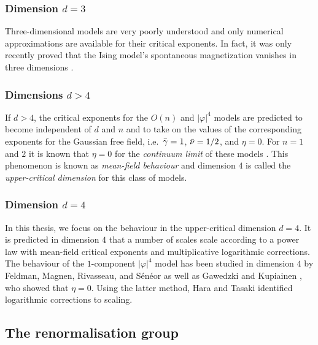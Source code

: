 \subsubsection{Dimension $d=3$}

Three-dimensional models are very poorly understood and only numerical approximations
are available for their critical exponents. In fact, it was only recently proved
that the Ising model's spontaneous magnetization vanishes in three dimensions \cite{ADS15}.

\subsubsection{Dimensions $d > 4$}

If $d > 4$, the critical exponents for the $O(n)$ and $|\varphi|^4$ models are
predicted to become independent of $d$ and $n$ and to take on the values of the
corresponding exponents for the Gaussian free field, i.e.\ $\bar\gamma = 1$,
$\bar\nu = 1/2$, and $\eta = 0$. For $n = 1$ and $2$ it is known that $\eta = 0$
for the \emph{continuum limit} of these models \cite{Aiz82,Fro82}.
This phenomenon is known as \emph{mean-field behaviour} and dimension $4$ is
called the \emph{upper-critical dimension} for this class of models.


\subsubsection{Dimension $d = 4$}

In this thesis, we focus on the behaviour in the upper-critical dimension $d = 4$.
It is predicted in dimension $4$ that a number of scales scale according to a
power law with mean-field critical exponents and multiplicative logarithmic
corrections. The behaviour of the $1$-component $|\varphi|^4$ model has been
studied in dimension $4$ by Feldman, Magnen, Rivasseau, and S\'{e}n\'{e}or
\cite{FMRS87} as well as Gawedzki and Kupiainen \cite{GK85}, who showed
that $\eta = 0$. Using the latter method, Hara and Tasaki \cite{HT87} identified
logarithmic corrections to scaling.


\subsection{The renormalisation group}
\label{sec:rg-intro}

